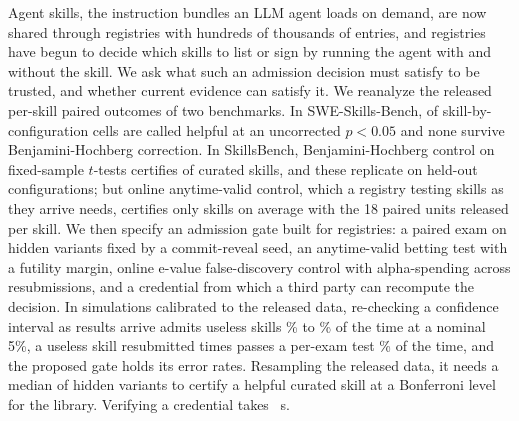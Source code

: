 Agent skills, the instruction bundles an LLM agent loads on demand, are now shared through registries with hundreds of thousands of entries, and registries have begun to decide which skills to list or sign by running the agent with and without the skill. We ask what such an admission decision must satisfy to be trusted, and whether current evidence can satisfy it. We reanalyze the released per-skill paired outcomes of two benchmarks. In SWE-Skills-Bench, \NSweGolden{} of \NSweCells{} skill-by-configuration cells are called helpful at an uncorrected $p<0.05$ and none survive Benjamini-Hochberg correction. In SkillsBench, Benjamini-Hochberg control on fixed-sample $t$-tests certifies \NSbTBH{} of \NSbTasks{} curated skills, and these replicate on held-out configurations; but online anytime-valid control, which a registry testing skills as they arrive needs, certifies only \NSbELond{} skills on average with the 18 paired units released per skill. We then specify an admission gate built for registries: a paired exam on hidden variants fixed by a commit-reveal seed, an anytime-valid betting test with a futility margin, online e-value false-discovery control with alpha-spending across resubmissions, and a credential from which a third party can recompute the decision. In simulations calibrated to the released data, re-checking a confidence interval as results arrive admits useless skills \NEOnePeekCIMin\% to \NEOnePeekCIMax\% of the time at a nominal 5\%, a useless skill resubmitted \PResub{} times passes a per-exam test \NResubPerExam\% of the time, and the proposed gate holds its error rates. Resampling the released data, it needs a median of \NSbMedNBonf{} hidden variants to certify a helpful curated skill at a Bonferroni level for the library. Verifying a credential takes \NESevenVerify{}~s.
